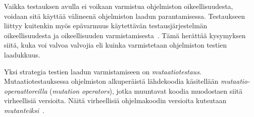 \documentclass[finnish, grading]{tktltiki2}
\theoremstyle{definition}
\theoremstyle{remark}
\begin{document}
%
%
%

Vaikka testauksen avulla ei voikaan varmistua ohjelmiston oikeellisuudesta, voidaan sitä käyttää välineenä ohjelmiston laadun parantamisessa. Testaukseen liittyy kuitenkin myös epävarmuus käytettävän testausjärjestelmän oikeellisuudesta ja oikeellisuuden varmistamisesta~\cite[s. 209]{Manna:Waldinger:1978}. Tämä herättää kysymyksen siitä, kuka voi valvoa valvojia eli kuinka varmistetaan ohjelmiston testien laadukkuus.

Yksi strategia testien laadun varmistamiseen on \textit{mutaatiotestaus}. Mutaatiotestauksessa ohjelmiston alkuperäistä lähdekoodia käsitellään \textit{mutaatio-operaattoreilla} (\textit{mutation operators}), jotka muuntavat koodia muodostaen siitä virheellisiä versioita. Näitä virheellisiä ohjelmakoodin versioita kutsutaan \textit{mutanteiksi}~\cite[s. 869]{Ma:Harrold:Kwon:2006}. 
\end{document}
